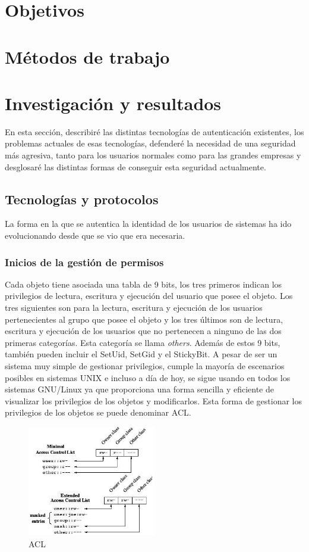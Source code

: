\documentclass[titlepage, 12pt, a4paper]{article}
\begin{document}
\section{Objetivos}
\section{Métodos de trabajo}
\section{Investigación y resultados}
En esta sección, describiré las distintas tecnologías de autenticación existentes, los problemas actuales de esas tecnologías, defenderé la necesidad de una seguridad más agresiva, tanto para los usuarios normales como para las grandes empresas y desglosaré las distintas formas de conseguir esta seguridad actualmente.
\subsection{Tecnologías y protocolos}
La forma en la que se autentica la identidad de los usuarios de sistemas ha ido evolucionando desde que se vio que era necesaria.
\subsubsection{Inicios de la gestión de permisos}
Cada objeto tiene asociada una tabla de 9 bits, los tres primeros indican los privilegios de lectura, escritura y ejecución del usuario que posee el objeto. Los tres siguientes son para la lectura, escritura y ejecución de los usuarios pertenecientes al grupo que posee el objeto y los tres últimos son de lectura, escritura y ejecución de los usuarios que no pertenecen a ninguno de las dos primeras categorías. Esta categoría se llama \textit{others}. Además de estos 9 bits, también pueden incluir el \Gls{SetUid}, \Gls{SetGid} y el \Gls{StickyBit}. A pesar de ser un sistema muy simple de gestionar privilegios, cumple la mayoría de escenarios posibles en sistemas UNIX e incluso a día de hoy, se sigue usando en todos los sistemas \Gls{GNU/Linux} ya que proporciona una forma sencilla y eficiente de visualizar los privilegios de los objetos y modificarlos. Esta forma de gestionar los privilegios de los objetos se puede denominar \Gls{ACL}.
\begin{figure}[H]
    \centering
    \includegraphics[width=0.5\textwidth]{Media/ACL.jpg}
    \caption{\Gls{ACL}}
    \label{fig:ACL}
\end{figure}
\end{document}
